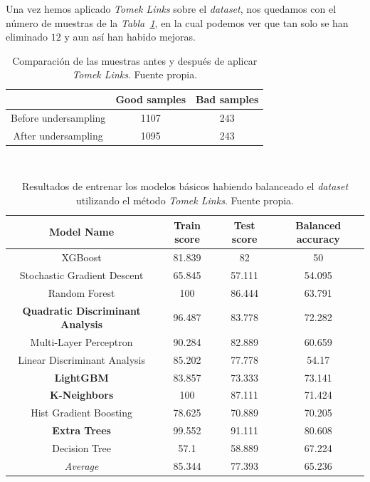 Una vez hemos aplicado \textit{Tomek Links} sobre el \textit{dataset}, nos quedamos con el número de muestras de la \textit{Tabla\ \ref{tab:balance-tl-comparison}}, en la cual podemos ver que tan solo se han eliminado $12$ y aun así han habido mejoras.

\begin{table}[!h]
    \centering
    \begin{tabular}{|c|cc|} \hline
        & Good samples & Bad samples \\ \hline
        Before undersampling & 1107 & 243 \\
        After undersampling & 1095 & 243 \\ \hline
    \end{tabular}
    \caption{Comparación de las muestras antes y después de aplicar \textit{Tomek Links}. Fuente propia.}\ \label{tab:balance-tl-comparison}
\end{table}

\begin{table}[!h]
    \centering
    \begin{tabular}{|c|ccc|}
    \hline
        Model Name & Train score & Test score & Balanced accuracy \\ \hline
        XGBoost & 81.839 & 82 & 50 \\ 
        Stochastic Gradient Descent & 65.845 & 57.111 & 54.095 \\ 
        Random Forest & 100 & 86.444 & 63.791 \\ 
        \textbf{Quadratic Discriminant Analysis} & 96.487 & 83.778 & 72.282 \\ 
        Multi-Layer Perceptron & 90.284 & 82.889 & 60.659 \\ 
        Linear Discriminant Analysis & 85.202 & 77.778 & 54.17 \\ 
        \textbf{LightGBM} & 83.857 & 73.333 & 73.141 \\ 
        \textbf{K-Neighbors} & 100 & 87.111 & 71.424 \\ 
        Hist Gradient Boosting & 78.625 & 70.889 & 70.205 \\ 
        \textbf{Extra Trees} & 99.552 & 91.111 & 80.608 \\ 
        Decision Tree & 57.1 & 58.889 & 67.224 \\ \hline
        \textit{Average} & 85.344 & 77.393 & 65.236 \\ \hline
    \end{tabular}
    \caption{Resultados de entrenar los modelos básicos habiendo balanceado el \textit{dataset} utilizando el método \textit{Tomek Links}. Fuente propia.}\ \label{tab:tomeklinks-basic-training}
\end{table}

